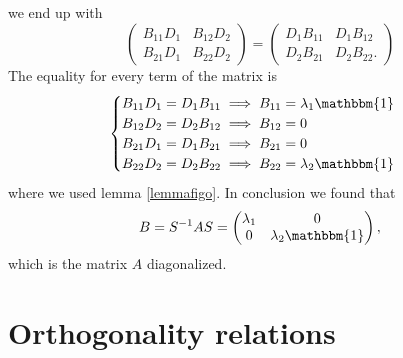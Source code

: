 \documentclass[12pt]{book}
\theoremstyle{plain}
\newcommand{\I}{\mathbbm{1}}
\theoremstyle{definition}
\theoremstyle{remark}
\begin{document}
we end up with
\[\begin{pmatrix}
B_{11}D_1&B_{12}D_2\\
B_{21}D_1&B_{22}D_2
\end{pmatrix} = \begin{pmatrix}
D_1B_{11}&D_1B_{12}\\
D_2B_{21}&D_2B_{22}.
\end{pmatrix}\]
The equality for every term of the matrix is
\[\begin{cases}
B_{11}D_1 = D_1 B_{11} \implies B_{11} = \lambda_1 \I \\
B_{12}D_2 = D_2 B_{12} \implies B_{12} = 0\\
B_{21}D_1 = D_1 B_{21} \implies B_{21} = 0\\
B_{22}D_2 = D_2 B_{22} \implies B_{22} = \lambda_2 \I 
\end{cases}\]
where we used lemma \ref{lemmafigo}. In conclusion we found that
\[B = S^{-1}AS = \begin{pmatrix}
\lambda_1 &0\\
0&\lambda_2\I
\end{pmatrix},\]
which is the matrix $A$ diagonalized.
\section{Orthogonality relations}
\end{document}
